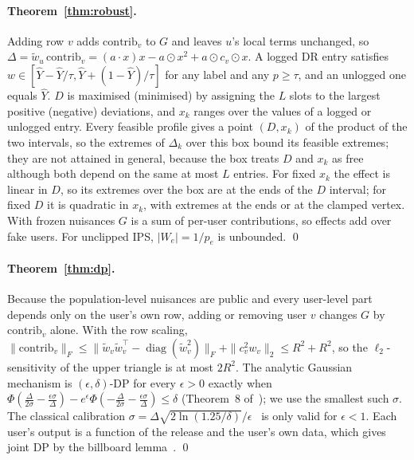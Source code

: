 \documentclass[preprint,review,12pt,authoryear]{elsarticle}
\theoremstyle{definition}
\newcommand{\diag}{\operatorname{diag}}
\begin{document}
\paragraph{Theorem~\ref{thm:robust}.}
Adding row $v$ adds $\mathrm{contrib}_v$ to $G$ and leaves $u$'s local terms
unchanged, so $\Delta=\tilde w_u\,\mathrm{contrib}_v=(a\cdot x)x-a\odot x^2+a\odot c_v\odot x$.
A logged DR entry satisfies $w\in[\hat Y-\hat Y/\tau,\hat Y+(1-\hat Y)/\tau]$ for any label
and any $p\ge\tau$, and an unlogged one equals $\hat Y$. $D$ is maximised
(minimised) by assigning the $L$ slots to the largest positive (negative)
deviations, and $x_k$ ranges over the values of a logged or unlogged entry.
Every feasible profile gives a point $(D,x_k)$ of the product of the two
intervals, so the extremes of $\Delta_k$ over this box bound its feasible
extremes; they are not attained in general, because the box treats $D$ and
$x_k$ as free although both depend on the same at most $L$ entries. For fixed
$x_k$ the effect is linear in $D$, so its extremes over the box are at the ends
of the $D$ interval; for fixed $D$ it is quadratic in $x_k$, with extremes at the
ends or at the clamped vertex. With frozen nuisances $G$ is a sum of
per-user contributions, so effects add over fake users. For
unclipped IPS, $|W_e|=1/p_e$ is unbounded. \qed

\paragraph{Theorem~\ref{thm:dp}.}
Because the population-level nuisances are public and every user-level part
depends only on the user's own row, adding or removing user $v$ changes $G$ by
$\mathrm{contrib}_v$ alone. With the row scaling,
$\|\mathrm{contrib}_v\|_F\le\|\tilde w_v\tilde w_v^\top-\diag(\tilde w_v^2)\|_F+\|c_v^2w_v\|_2\le R^2+R^2$,
so the $\ell_2$-sensitivity of the upper triangle is at most $2R^2$. The analytic
Gaussian mechanism is $(\epsilon,\delta)$-DP for every $\epsilon>0$ exactly when
$\Phi(\frac{\Delta}{2\sigma}-\frac{\epsilon\sigma}{\Delta})-e^\epsilon\Phi(-\frac{\Delta}{2\sigma}-\frac{\epsilon\sigma}{\Delta})\le\delta$
(Theorem~8 of~\citet{balle2018analytic}); we use the smallest such $\sigma$. The
classical calibration $\sigma=\Delta\sqrt{2\ln(1.25/\delta)}/\epsilon$~\citep{dwork2014algorithmic}
is only valid for $\epsilon<1$. Each user's output is a function of the release and
the user's own data, which gives joint DP by the billboard
lemma~\citep{hsu2014matchings}. \qed
\end{document}
